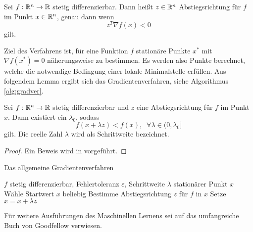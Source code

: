 \begin{defi}[Abstiegsrichtung]
    Sei $f:\mathbb{R}^n \rightarrow \mathbb{R}$ stetig differenzierbar. Dann heißt $z \in \mathbb{R}^n$ Abstiegsrichtung für $f$ im Punkt $x \in \mathbb{R}^n$, genau dann wenn
    \begin{equation*}
        z^T \nabla f(x) <0
    \end{equation*}
    gilt. 
\end{defi}
Ziel des Verfahrens ist, für eine Funktion $f$ stationäre Punkte $x^*$ mit $\nabla f(x^*)=0$ näherungsweise zu bestimmen. Es werden also Punkte berechnet, welche die notwendige Bedingung einer lokale Minimalstelle erfüllen.
Aus folgendem Lemma ergibt sich das Gradientenverfahren, siehe Algorithmus \ref{alg:gradver}. 
\begin{lem}
    \label{abst_dir}
    Sei $f:\mathbb{R}^n \rightarrow \mathbb{R}$ stetig differenzierbar und $z$ eine Abstiegsrichtung für $f$ im Punkt $x$. Dann existiert ein $\lambda_0$, sodass 
    \begin{equation*}
        f(x+\lambda z) < f(x), \; \; \forall \lambda \in (0, \lambda_0]
    \end{equation*}
    gilt. Die reelle Zahl $\lambda$ wird als Schrittweite bezeichnet.
\end{lem}

\begin{proof}
    Ein Beweis wird in \cite{nocedal1999numerical} vorgeführt.
\end{proof}

\begin{algorithm}[h]
    \caption{Das allgemeine Gradientenverfahren}\label{alg:gradver}
    \begin{algorithmic}
    \Require $f$ stetig differenzierbar, Fehlertoleranz $\varepsilon$, Schrittweite $\lambda$ 
    \Ensure stationärer Punkt $x$
    \State Wähle Startwert $x$ beliebig
        \State Bestimme Abstiegsrichtung $z$ für $f$ in $x$
        \State Setze $x=x+ \lambda z$
    \EndWhile
    \end{algorithmic}
\end{algorithm}

Für weitere Ausführungen des Maschinellen Lernens sei auf das umfangreiche Buch von Goodfellow\cite{Goodfellow-et-al-2016} verwiesen.

